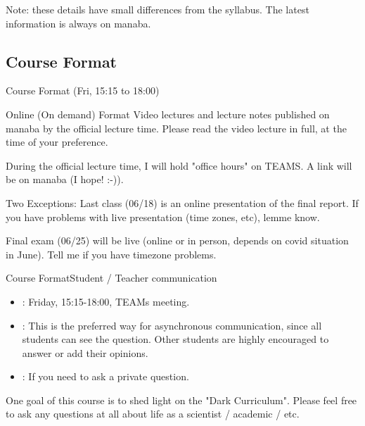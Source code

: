 \documentclass[aspectratio=169]{beamer}
\begin{document}
\begin{CJK}{UTF8}{ipxm}
\begin{frame}
  \alert{Note}: these details have small differences from the syllabus. The latest information is always on manaba.
\end{frame}

\subsection{Course Format}
\begin{frame}{Course Format (Fri, 15:15 to 18:00)}
  \begin{block}{Online (On demand) Format}
    Video lectures and lecture notes published on manaba by the official lecture time. Please read the video lecture in full, at the time of your preference.
    \bigskip

    During the official lecture time, I will hold "office hours" on TEAMS. A link will be on manaba (I hope! :-)).
  \end{block}

  \begin{alertblock}{Two Exceptions:}
    Last class (06/18) is an online presentation of the final report. If you have problems with live presentation (time zones, etc), lemme know.\bigskip

    Final exam (06/25) will be live (online or in person, depends on covid situation in June). Tell me if you have timezone problems.
  \end{alertblock}
\end{frame}

\begin{frame}{Course Format}{Student / Teacher communication}
  \begin{itemize}
    \item {}: Friday, 15:15-18:00, TEAMs meeting.\bigskip

    \item {}: This is the preferred way for asynchronous communication, since all students can see the question. Other students are highly encouraged to answer or add their opinions.\bigskip

    \item {}: If you need to ask a private question.
  \end{itemize}\bigskip

  One goal of this course is to shed light on the "Dark Curriculum". Please feel free to ask any questions at all about life as a scientist / academic / etc.
\end{frame}


\end{CJK}
\end{document}
